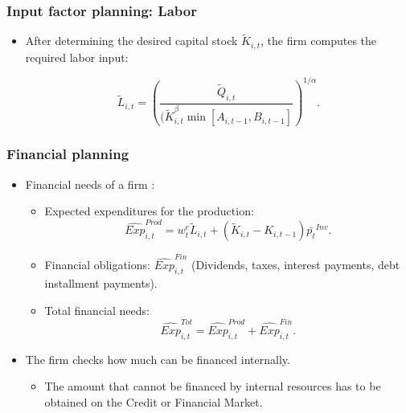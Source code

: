 \documentclass{beamer}
\begin{document}
\frame
{

  \frametitle{Input factor planning: Labor} 
\begin{itemize}

\item After determining the desired capital stock $\tilde{K}_{i,t}$, the firm computes the required labor input:	

\[
{\tilde L}_{i,t} = \left( \frac{\tilde Q_{i,t}}{(\tilde{K}_{i,t}^{\beta} \min [A_{i,t-1}, B_{i,t-1}]} \right)^{1/\alpha}.
\]	
	
\end{itemize}

}


\frame
{

  \frametitle{Financial planning} 
\begin{itemize}

\item Financial needs of a firm :
\begin{itemize}
	\item  Expected expenditures for the production: 
	\[
	\hat{Exp}^{Prod}_{i,t}= w_t^e \tilde L_{i,t} + (\tilde{K}_{i,t}-K_{i,t-1})\bar{p_{t}}^{Inv}.
	\]

	\item Financial obligations: $\hat{Exp}^{Fin}_{i,t}$ (Dividends, taxes, interest payments, debt installment payments).
	
	 \item Total financial needs: 
	 \[
	 \hat{Exp}^{Tot}_{i,t}= \hat{Exp}^{Prod}_{i,t} + \hat{Exp}^{Fin}_{i,t}.
	 \]
\end{itemize}

\item The firm checks how much can be financed internally.
\begin{itemize}
	\item The amount that cannot be financed by internal resources has to be obtained on the Credit or Financial Market. 
\end{itemize}
  




\end{itemize}

}
\frame
\end{document}
